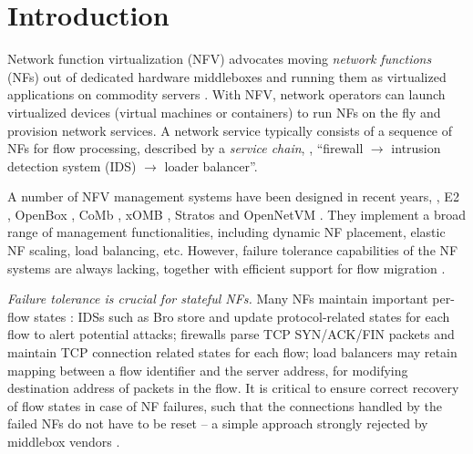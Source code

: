 \section{Introduction}


Network function virtualization (NFV) advocates moving
{\em network functions} (NFs) out of dedicated hardware middleboxes and running them as
virtualized applications on commodity servers \cite{nfv-white-paper}. With NFV, network
operators %
can launch virtualized devices (virtual machines or containers) to run NFs on the fly %
 and provision network services. A network service typically consists of a sequence of NFs for flow processing, described by a {\em service chain}, \eg, ``firewall $\rightarrow$ intrusion detection system (IDS) $\rightarrow$ loader balancer''.

A number of NFV management systems have been designed in recent years, \eg, E2 \cite{palkar2015e2}, OpenBox \cite{OpenBox}, CoMb
\cite{sekar2012design}, xOMB \cite{anderson2012xomb}, Stratos
\cite{gember2012stratos} and OpenNetVM \cite{zhang2016opennetvm}. %
They implement a
broad range of management functionalities, including %
 dynamic NF placement, elastic NF scaling,
load balancing, etc. %
 However, failure
tolerance \cite{rajagopalan2013pico, sherry2015rollback} capabilities of the NF systems are always lacking, together with efficient support for flow migration \cite{gember2015opennf, rajagopalan2013split, khalid2016paving}.%

{\em Failure tolerance is crucial for stateful NFs.}  Many NFs maintain important per-flow states \cite{EnablingNF}: IDSs such as Bro \cite{bro} %
 store and update protocol-related states for each flow to alert potential attacks; firewalls \cite{firewall} parse TCP SYN/ACK/FIN packets and maintain TCP connection related states for
each flow; load balancers \cite{lvs} may retain mapping between a flow identifier and
the server address, for modifying destination address of packets in the flow.
It is critical to ensure correct recovery of flow states in case of NF failures, such that the connections handled by the failed NFs do not have to be reset -- a simple approach strongly rejected by middlebox vendors \cite{sherry2015rollback}.

